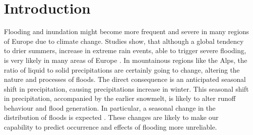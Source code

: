 \chapter{Introduction}
\label{chp:introduction}

\newcommand{\keyword}[1]{\textbf{#1}}
\newcommand{\tabhead}[1]{\textbf{#1}}
\newcommand{\code}[1]{\texttt{#1}}
\newcommand{\file}[1]{\texttt{\bfseries#1}}
\newcommand{\option}[1]{\texttt{\itshape#1}}












Flooding and inundation might become more frequent and severe in many regions of Europe due to climate change.
Studies show, that although a global tendency to drier summers, increase in extreme rain events, able to trigger severe flooding, is very likely in many areas of Europe \autocite{christensen_severe_2002}.
In mountainous regions like the Alps, the ratio of liquid to solid precipitations are certainly going to change, altering the nature and processes of floods.
The direct consequence is an anticipated seasonal shift in precipitation, causing precipitations increase in winter. 
This seasonal shift in precipitation, accompanied by the earlier snowmelt, is likely to alter runoff behaviour and flood generation.
In particular, a seasonal change in the distribution of floods is expected \autocite{koplin_seasonality_2014}.
These changes are likely to make our capability to predict occurrence and effects of flooding more unreliable.

